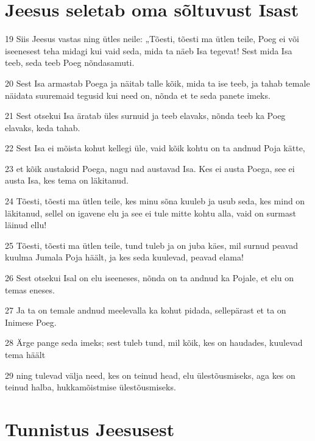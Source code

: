 \section*{Jeesus seletab oma sõltuvust Isast}

\par 19 Siis Jeesus vastas ning ütles neile: „Tõesti, tõesti ma ütlen teile, Poeg ei või iseenesest teha midagi kui vaid seda, mida ta näeb Isa tegevat! Sest mida Isa teeb, seda teeb Poeg nõndasamuti.
\par 20 Sest Isa armastab Poega ja näitab talle kõik, mida ta ise teeb, ja tahab temale näidata suuremaid tegusid kui need on, nõnda et te seda panete imeks.
\par 21 Sest otsekui Isa äratab üles surnuid ja teeb elavaks, nõnda teeb ka Poeg elavaks, keda tahab.
\par 22 Sest Isa ei mõista kohut kellegi üle, vaid kõik kohtu on ta andnud Poja kätte,
\par 23 et kõik austaksid Poega, nagu nad austavad Isa. Kes ei austa Poega, see ei austa Isa, kes tema on läkitanud.
\par 24 Tõesti, tõesti ma ütlen teile, kes minu sõna kuuleb ja usub seda, kes mind on läkitanud, sellel on igavene elu ja see ei tule mitte kohtu alla, vaid on surmast läinud ellu!
\par 25 Tõesti, tõesti ma ütlen teile, tund tuleb ja on juba käes, mil surnud peavad kuulma Jumala Poja häält, ja kes seda kuulevad, peavad elama!
\par 26 Sest otsekui Isal on elu iseeneses, nõnda on ta andnud ka Pojale, et elu on temas eneses.
\par 27 Ja ta on temale andnud meelevalla ka kohut pidada, sellepärast et ta on Inimese Poeg.
\par 28 Ärge pange seda imeks; sest tuleb tund, mil kõik, kes on haudades, kuulevad tema häält
\par 29 ning tulevad välja need, kes on teinud head, elu ülestõusmiseks, aga kes on teinud halba, hukkamõistmise ülestõusmiseks.

\section*{Tunnistus Jeesusest}

